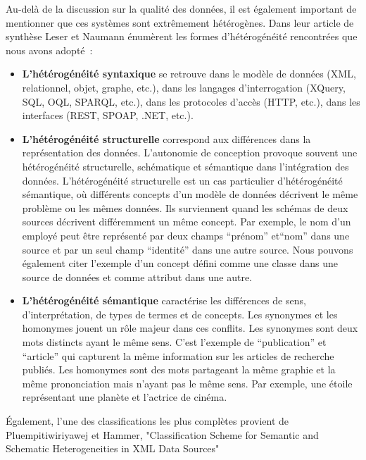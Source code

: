  Au-delà de la discussion sur la qualité des données, il est également important de mentionner que ces systèmes sont extrêmement hétérogènes.
 Dans leur article de synthèse Leser et Naumann énumèrent les formes d'hétérogénéité rencontrées que nous avons adopté~\cite{dils2006}:\\
 \begin{itemize}
     \item  \textbf{L'hétérogénéité syntaxique} se retrouve dans le modèle de données (XML, relationnel, objet, graphe, etc.), dans les langages d’interrogation (XQuery, SQL,  OQL, SPARQL, etc.), dans les protocoles d’accès (HTTP, etc.), dans les interfaces (REST, SPOAP, .NET, etc.).\\
      
     \item  \textbf{L'hétérogénéité structurelle} correspond aux différences dans la représentation des données. L'autonomie de conception provoque souvent une hétérogénéité structurelle, schématique et sémantique dans l'intégration des données.  L'hétérogénéité structurelle est un cas particulier d'hétérogénéité sémantique, où différents concepts d'un modèle de données décrivent le même problème ou les mêmes données. Ils surviennent quand les schémas de deux sources décrivent différemment un même concept. Par exemple, le nom d’un employé peut être représenté par deux champs “prénom” et“nom” dans une source et par un seul champ “identité” dans une autre source. Nous pouvons également citer l’exemple d’un concept défini comme une classe dans une source de données et comme attribut dans une autre. \\

     \item  \textbf{L'hétérogénéité sémantique} caractérise les différences de sens, d'interprétation, de types de termes et de concepts. Les synonymes et les homonymes jouent un rôle majeur dans ces conflits. Les synonymes sont deux  mots distincts ayant le même sens. C’est l’exemple de “publication” et  “article” qui capturent la  même information sur les articles de recherche publiés. Les homonymes sont des mots partageant la même graphie et la même prononciation mais n’ayant pas le même sens. Par   exemple,  une étoile représentant une planète et l'actrice de cinéma. \\

 \end{itemize}
 
 
Également, l'une des classifications les plus complètes provient de Pluempitiwiriyawej et Hammer, "Classification Scheme for Semantic and Schematic Heterogeneities in XML Data Sources"~\cite{bergman2006}\\
 


